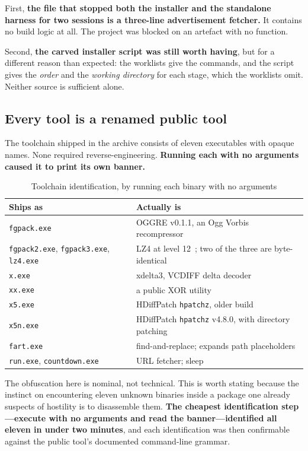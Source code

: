 First, \textbf{the file that stopped both the installer and the standalone
harness for two sessions is a three-line advertisement fetcher.} It contains no
build logic at all. The project was blocked on an artefact with no function.

Second, \textbf{the carved installer script was still worth having}, but for a
different reason than expected: the worklists give the commands, and the script
gives the \emph{order} and the \emph{working directory} for each stage, which the
worklists omit. Neither source is sufficient alone.

\subsection{Every tool is a renamed public tool}

The toolchain shipped in the archive consists of eleven executables with opaque
names. None required reverse-engineering. \textbf{Running each with no arguments
caused it to print its own banner.}

\begin{table}[htbp]
\caption{Toolchain identification, by running each binary with no arguments}
\label{tab:tools}
\centering
\footnotesize
\begin{tabularx}{\columnwidth}{@{}L{2.4cm}X@{}}
\toprule
\textbf{Ships as} & \textbf{Actually is} \\
\midrule
\verb|fgpack.exe| & OGGRE v0.1.1, an Ogg Vorbis recompressor~\cite{vorbis} \\
\verb|fgpack2.exe|, \verb|fgpack3.exe|, \verb|lz4.exe| &
  LZ4 at level 12~\cite{lz4}; two of the three are byte-identical \\
\verb|x.exe| & xdelta3, VCDIFF delta decoder~\cite{rfc3284} \\
\verb|xx.exe| & a public XOR utility \\
\verb|x5.exe| & HDiffPatch \verb|hpatchz|, older build~\cite{hdiffpatch} \\
\verb|x5n.exe| & HDiffPatch \verb|hpatchz| v4.8.0, with directory patching \\
\verb|fart.exe| & find-and-replace; expands path placeholders \\
\verb|run.exe|, \verb|countdown.exe| & URL fetcher; sleep \\
\bottomrule
\end{tabularx}
\end{table}

The obfuscation here is nominal, not technical. This is worth stating because the
instinct on encountering eleven unknown binaries inside a package one already
suspects of hostility is to disassemble them. \textbf{The cheapest identification
step---execute with no arguments and read the banner---identified all eleven in
under two minutes}, and each identification was then confirmable against the
public tool's documented command-line grammar.

